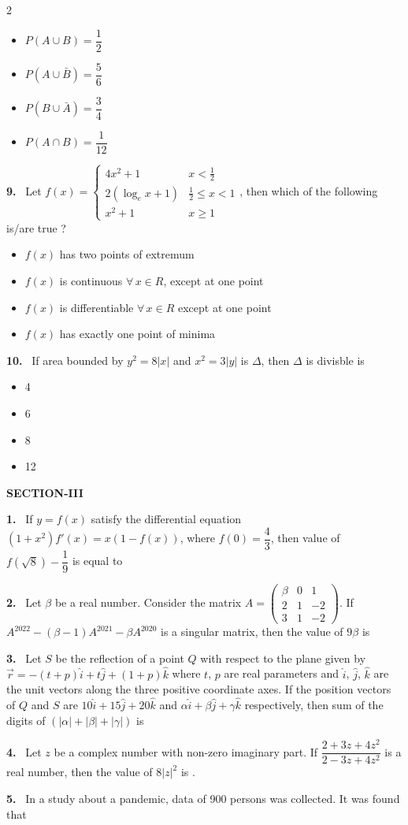\documentclass[10pt]{extarticle}
\newcommand{\sect}[1]{\par\smallskip\noindent\textbf{#1}\par}
\newcommand{\qn}[1]{\par\smallskip\noindent\textbf{#1.}~}
\newenvironment{qoptions}{\begin{itemize}[leftmargin=1.8em,itemsep=1pt,topsep=2pt,label={}]}{\end{itemize}}
\newcommand{\opt}[2]{\item[(#1)] #2}
\begin{document}
\begin{multicols}{2}
\begin{qoptions}
\opt{A}{$P(A\cup B)=\dfrac12$}
\opt{B}{$P(A\cup\bar B)=\dfrac56$}
\opt{C}{$P(B\cup\bar A)=\dfrac34$}
\opt{D}{$P(A\cap B)=\dfrac1{12}$}
\end{qoptions}
\qn{9} Let $f(x)=\begin{cases}4x^2+1 & x<\frac12\\ 2(\log_ex+1) & \frac12\le x<1\\ x^2+1 & x\ge1\end{cases}$, then which of the following is/are true ?
\begin{qoptions}
\opt{A}{$f(x)$ has two points of extremum}
\opt{B}{$f(x)$ is continuous $\forall\,x\in R$, except at one point}
\opt{C}{$f(x)$ is differentiable $\forall\,x\in R$ except at one point}
\opt{D}{$f(x)$ has exactly one point of minima}
\end{qoptions}
\qn{10} If area bounded by $y^2=8|x|$ and $x^2=3|y|$ is $\Delta$, then $\Delta$ is divisble is
\begin{qoptions}
\opt{A}{4}
\opt{B}{6}
\opt{C}{8}
\opt{D}{12}
\end{qoptions}
\sect{SECTION-III}
\qn{1} If $y=f(x)$ satisfy the differential equation $(1+x^2)f'(x)=x(1-f(x))$, where $f(0)=\dfrac43$, then value of $f\left(\sqrt8\right)-\dfrac19$ is equal to
\qn{2} Let $\beta$ be a real number. Consider the matrix $A=\begin{pmatrix}\beta&0&1\\2&1&-2\\3&1&-2\end{pmatrix}$. If $A^{2022}-(\beta-1)A^{2021}-\beta A^{2020}$ is a singular matrix, then the value of $9\beta$ is \underline{\hspace{1.2cm}}
\qn{3} Let $S$ be the reflection of a point $Q$ with respect to the plane given by $\vec r=-(t+p)\hat i+t\hat j+(1+p)\hat k$ where $t$, $p$ are real parameters and $\hat i$, $\hat j$, $\hat k$ are the unit vectors along the three positive coordinate axes. If the position vectors of $Q$ and $S$ are $10\hat i+15\hat j+20\hat k$ and $\alpha\hat i+\beta\hat j+\gamma\hat k$ respectively, then sum of the digits of $(|\alpha|+|\beta|+|\gamma|)$ is
\qn{4} Let $z$ be a complex number with non-zero imaginary part. If $\dfrac{2+3z+4z^2}{2-3z+4z^2}$ is a real number, then the value of $8|z|^2$ is \underline{\hspace{1.2cm}}.
\qn{5} In a study about a pandemic, data of 900 persons was collected. It was found that

\end{multicols}
\end{document}
